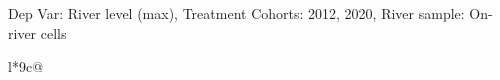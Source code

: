 \begin{table}[H]
\captionlistentry[table]{}
\label{table:beaver_hydrometry_DVlevel_max_SCg13}
\tiny %
Dep Var: River level (max), Treatment Cohorts: 2012, 2020, River sample: On-river cells \\
\begin{threeparttable}
\begin{tabulary}{\textwidth}{l*{9}{c}@{}}
\toprule \toprule
\noalign{\smallskip}
\noalign{\smallskip}
\midrule \bottomrule
\end{tabulary}
\medskip
\end{threeparttable}
\end{table}
